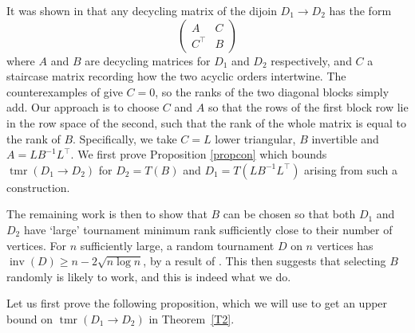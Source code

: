\documentclass[10pt,a4paper]{amsart}
\numberwithin{equation}{section}
\theoremstyle{plain}
\theoremstyle{remark}
\theoremstyle{definition}
\newcommand{\tmr}{\operatorname{tmr}}
\newcommand{\inv}{\operatorname{inv}}
\begin{document}
It was shown in \cite{natcase} that any decycling matrix of the dijoin $D_1 \to D_2$ has the form
\begin{equation*}
\begin{pmatrix}
    A &C\\ C^{\top} & B
\end{pmatrix}
\end{equation*}
where $A$ and $B$ are decycling matrices for $D_1$ and $D_2$ respectively, and $C$ a staircase matrix recording how the two acyclic orders intertwine. The counterexamples of \cite{Alon,Problems} give  $C=0$, so the ranks of the two diagonal blocks simply add. Our approach is to choose $C$ and $A$ so that the rows of the first block row lie in the row space of the second, such that the rank of the whole matrix is equal to the rank of $B$. Specifically, we take $C=L$ lower triangular, $B$ invertible and $A = L B^{-1}L^{\top}$. 
We first prove Proposition \ref{propcon} which bounds $\tmr(D_1 \rightarrow D_2)$ for $D_2 = T(B)$ and $D_1 = T(LB^{-1}L^{\top})$ arising from such a construction.


The remaining work is then to show that $B$ can be chosen so that both $D_1$ and $D_2$ have `large' tournament minimum rank sufficiently close to their number of vertices.  For $n$ sufficiently large, a random tournament $D$ on $n$ vertices has $\inv(D) \ge n - 2\sqrt{n\log{n}}$, by a result of \cite[Theorem 1.5]{Problems}. This then suggests that selecting $B$ randomly is likely to work, and this is indeed what we do.

\bigskip

Let us first prove the following proposition, which we will use to get an upper bound on $\tmr(D_1 \rightarrow D_2)$ in Theorem~\ref{T2}.
\end{document}
